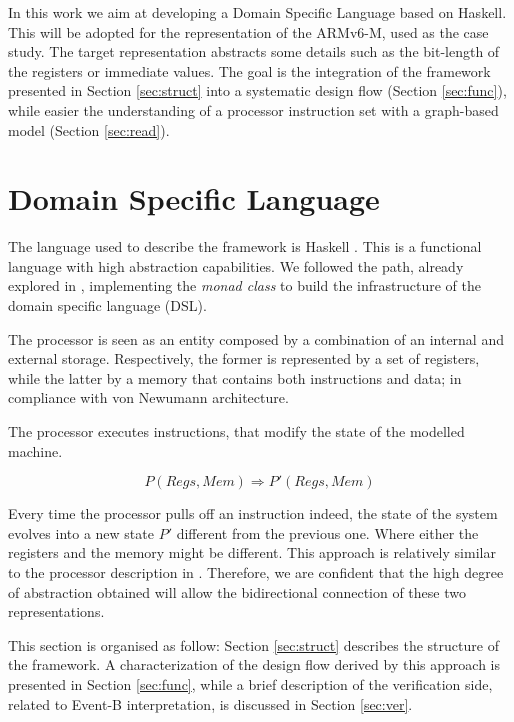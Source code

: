 \documentclass[conference]{IEEEtran}
\begin{document}
In this work we aim at developing a Domain Specific Language based on Haskell. This will be
adopted for the representation of the ARMv6-M, used as the case study. The target
representation abstracts some details such as the bit-length of the registers or immediate
values. The goal is the integration of the framework presented in Section \ref{sec:struct}
into a systematic design flow (Section \ref{sec:func}), while easier the understanding of
a processor instruction set with a graph-based model (Section \ref{sec:read}).


\section{Domain Specific Language}
\label{sec:dsl}
The language used to describe the framework is Haskell \cite{haskell}. This is a 
functional language with high abstraction capabilities.
We followed the path, already explored in \cite{armv7}, implementing the \textit{monad class}
to build the infrastructure of the domain specific language (DSL).

The processor is seen as an entity composed by a combination of an internal and
external storage. Respectively, the former is represented by a set of registers,
while the latter by a memory that contains both instructions and data; in compliance with von
Newumann architecture. 

The processor executes instructions, that modify the state of the modelled machine.

$$P(Regs, Mem) \Rightarrow P'(Regs, Mem)$$

\noindent Every time the processor pulls off an instruction indeed, the state of the system
evolves into a new state $P'$ different from the previous one. Where either the registers and
the memory might be different. This approach is relatively similar to the processor
description in \cite{isaFunc}. Therefore, we are confident that the high degree of
abstraction obtained will allow the bidirectional connection of these two representations.

This section is organised as follow: Section \ref{sec:struct} describes the structure of the
framework. A characterization of the design flow derived by this approach is presented in
Section \ref{sec:func}, while a brief description of the verification side, related to Event-B
interpretation, is discussed in Section \ref{sec:ver}.
\end{document}
